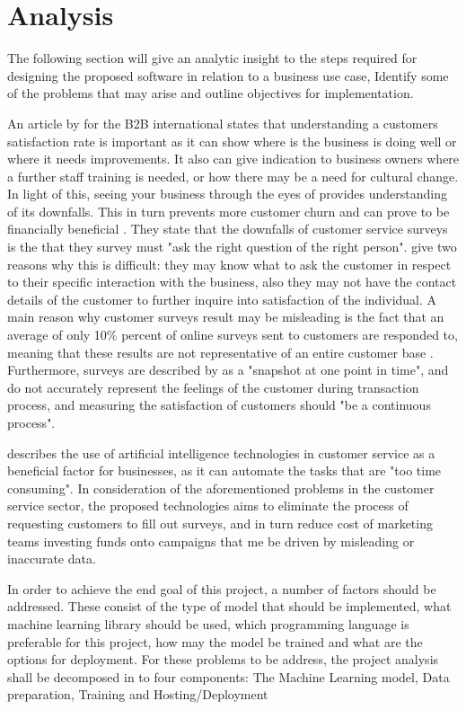 \chapter{Analysis }

The following section will give an analytic insight to the steps required for designing the proposed software in relation to a business use case, Identify some of the problems that may arise and outline objectives for implementation.

An article by \citeauthor{hague} for the B2B international states that understanding a customers satisfaction rate is important as it can show where is the business is doing well or where it needs improvements. It also can give indication to business owners where a further staff training is needed, or how there may be a need for cultural change. In light of this, seeing your business through the eyes of provides understanding of its downfalls. This in turn prevents more customer churn and can prove to be financially beneficial \citep{hague}. They state that the downfalls of customer service surveys is the that they survey must "ask the right question of the right person". \citeauthor{hague} give two reasons why this is difficult: they may know what to ask the customer in respect to their specific interaction with the business, also they may not have the contact details of the customer to further inquire into satisfaction of the individual. A main reason why customer surveys result may be misleading is the fact that an average of only 10\% percent of online surveys sent to customers are responded to, meaning that these results are not representative of an entire customer base \citep{willott} . Furthermore, surveys are described by \citeauthor{hague} as a "snapshot at one point in time", and do not accurately represent the feelings of the customer during transaction process, and measuring the satisfaction of customers should "be a continuous process".


\citeauthor{keith} describes the use of artificial intelligence technologies in customer service as a beneficial factor for businesses, as it can automate the tasks that are "too time consuming".
In consideration of the aforementioned problems in the customer service sector, the proposed technologies aims to eliminate the process of requesting customers to fill out surveys, and in turn reduce cost of marketing teams investing funds onto campaigns that me be driven by misleading or inaccurate data.

In order to achieve the end goal of this project, a number of factors should be addressed. These consist of the type of model that should be implemented, what machine learning library should be used, which programming language is preferable for this project, how may the model be trained and what are the options for deployment. For these problems to be address, the project analysis shall be decomposed in to four components: The Machine Learning model, Data preparation, Training and Hosting/Deployment



